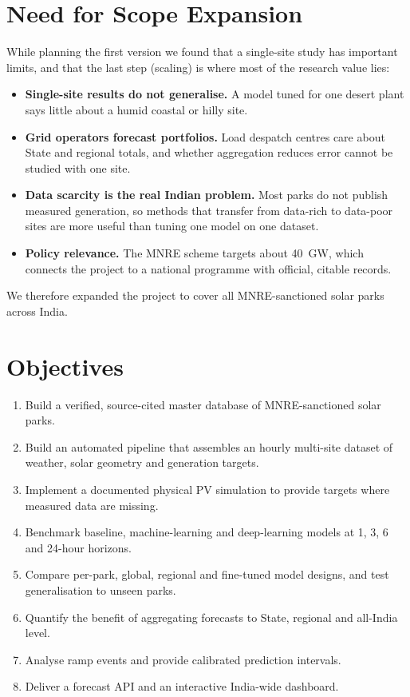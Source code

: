 \documentclass[12pt]{report}
\begin{document}
\section{Need for Scope Expansion}
\vspace{1mm}
While planning the first version we found that a single-site study has important limits, and that the last step (scaling) is where most of the research value lies:
\begin{itemize}[noitemsep]
    \item \textbf{Single-site results do not generalise.} A model tuned for one desert plant says little about a humid coastal or hilly site.
    \item \textbf{Grid operators forecast portfolios.} Load despatch centres care about State and regional totals, and whether aggregation reduces error cannot be studied with one site.
    \item \textbf{Data scarcity is the real Indian problem.} Most parks do not publish measured generation, so methods that transfer from data-rich to data-poor sites are more useful than tuning one model on one dataset.
    \item \textbf{Policy relevance.} The MNRE scheme targets about 40~GW, which connects the project to a national programme with official, citable records.
\end{itemize}
We therefore expanded the project to cover all MNRE-sanctioned solar parks across India.

\section{Objectives}
\vspace{1mm}
\begin{enumerate}[noitemsep]
    \item Build a verified, source-cited master database of MNRE-sanctioned solar parks.
    \item Build an automated pipeline that assembles an hourly multi-site dataset of weather, solar geometry and generation targets.
    \item Implement a documented physical PV simulation to provide targets where measured data are missing.
    \item Benchmark baseline, machine-learning and deep-learning models at 1, 3, 6 and 24-hour horizons.
    \item Compare per-park, global, regional and fine-tuned model designs, and test generalisation to unseen parks.
    \item Quantify the benefit of aggregating forecasts to State, regional and all-India level.
    \item Analyse ramp events and provide calibrated prediction intervals.
    \item Deliver a forecast API and an interactive India-wide dashboard.
\end{enumerate}
\end{document}
